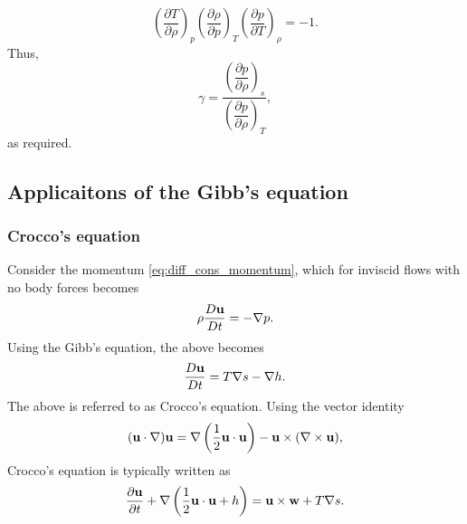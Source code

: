\documentclass[oneside,a4paper,11pt]{report}
\begin{document}
\begin{equation}
    \left( \frac{\partial T}{\partial \rho} \right)_p \left( \frac{\partial \rho}{\partial p} \right)_T \left( \frac{\partial p}{\partial T} \right)_\rho = -1.
\end{equation}
Thus,
\begin{equation}
    \gamma = \frac{ \left( \dfrac{\partial p}{\partial \rho} \right)_s }{\left( \dfrac{\partial p}{\partial \rho} \right)_T},
\end{equation}
as required.

\subsection{Applicaitons of the Gibb's equation}

\subsubsection{Crocco's equation}
Consider the momentum \cref{eq:diff_cons_momentum}, which for inviscid flows with no body forces becomes
\begin{equation}
    \rho \frac{D \mathbf{u}}{Dt} = -\nabla p.
\end{equation}
Using the Gibb's equation, the above becomes
\begin{equation}
    \frac{D \mathbf{u}}{Dt} = T\nabla s - \nabla h.
\end{equation}
The above is referred to as Crocco's equation. Using the vector identity
\begin{equation}
    (\mathbf{u} \cdot \nabla) \mathbf{u} = \nabla \left ( \frac{1}{2} \mathbf{u} \cdot \mathbf{u} \right ) - \mathbf{u} \times (\nabla \times \mathbf{u}),
\end{equation}
Crocco's equation is typically written as
\begin{equation}
    \frac{\partial \mathbf{u}}{\partial t} + \nabla \left (\frac{1}{2} \mathbf{u} \cdot \mathbf{u} + h \right ) = \mathbf{u} \times \mathbf{w} + T \nabla s.
\end{equation}
\end{document}
